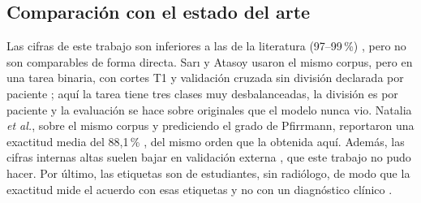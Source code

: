 \subsection{Comparación con el estado del arte}
\label{sec:res_sota}
Las cifras de este trabajo son inferiores a las de la literatura (97--99\,\%) \cite{sari2025,liawrungrueang2023}, pero no son comparables de forma directa. Sarı y Atasoy usaron el mismo corpus, pero en una tarea binaria, con cortes T1 y validación cruzada sin división declarada por paciente \cite{sari2025}; aquí la tarea tiene tres clases muy desbalanceadas, la división es por paciente y la evaluación se hace sobre originales que el modelo nunca vio. Natalia \emph{et al.}, sobre el mismo corpus y prediciendo el grado de Pfirrmann, reportaron una exactitud media del 88,1\,\% \cite{natalia2024}, del mismo orden que la obtenida aquí. Además, las cifras internas altas suelen bajar en validación externa \cite{yi2023,nigru2024}, que este trabajo no pudo hacer. Por último, las etiquetas son de estudiantes, sin radiólogo, de modo que la exactitud mide el acuerdo con esas etiquetas y no con un diagnóstico clínico \cite{shi2024}.
